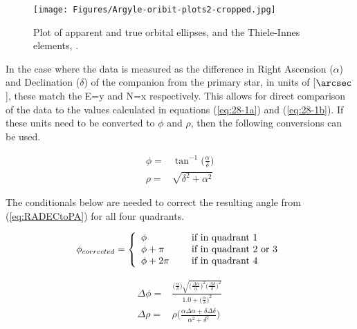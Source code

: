 \documentclass[10pt,preprint]{aastex}
\begin{document}
\begin{figure}[ht]
\begin{center}
\texttt{[image: Figures/Argyle-oribit-plots2-cropped.jpg]}
\caption[Apparent and True orbital ellipses]{ Plot of apparent and true orbital ellipses, and the Thiele-Innes elements, \citet{Argyle}. }
\label{fig:apparentTrueEllipses}
\end{center}
\end{figure}

In the case where the data is measured as the difference in Right Ascension ($\alpha$) and Declination ($\delta$) of the companion from the primary star, in units of [$\arcsec$], these match the E=y and N=x respectively.  This allows for direct comparison of the data to the values calculated in equations  (\ref{eq:28-1a}) and (\ref{eq:28-1b}).  If these units need to be converted to $\phi$ and $\rho$, then the following conversions can be used.

\begin{subequations}
\begin{align}\label{eq:RADECtoPA}
\phi =&   \tan^{-1}\bigg(\frac{\alpha}{\delta} \bigg)\\
\label{eq:RADECtoSA}
\rho =&   \sqrt{\delta^2+\alpha^2}
\end{align}
\end{subequations}

The conditionals below are needed to correct the resulting angle from (\ref{eq:RADECtoPA}) for all four quadrants.

\begin{equation}\label{eq:4.1.PAcorrection}
\phi_{corrected} = \left\{ \begin{array}{l l l} \phi& \quad \text{ if in quadrant 1}\\ \phi + \pi& \quad \text{ if in quadrant 2 or 3}\\ \phi + 2\pi& \quad \text{ if in quadrant 4}  \end{array} \right.
\end{equation}

\begin{subequations}
\begin{align}\label{eq:RADECtoPAerr}
\Delta\phi =&   \frac{\bigg(\frac{\alpha}{\delta}\bigg) \sqrt{\bigg( \frac{\Delta\alpha}{\alpha} \bigg)^2 \bigg( \frac{\Delta\delta}{\delta} \bigg)^2} }{1.0+\bigg(\frac{\alpha}{\delta} \bigg)^2}\\
\label{eq:RADECtoSAerr}
\Delta\rho =&   \rho\Bigg(\frac{\alpha\Delta\alpha + \delta\Delta\delta}{\alpha^2 + \delta^2} \Bigg)
\end{align}
\end{subequations}
\end{document}

